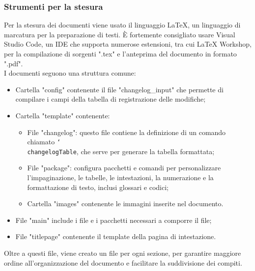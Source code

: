 \subsubsection{Strumenti per la stesura}
Per la stesura dei documenti viene usato il linguaggio LaTeX, un linguaggio di
marcatura per la preparazione di testi. È fortemente consigliato usare Visual
Studio Code, un IDE che supporta numerose estensioni, tra cui LaTeX Workshop,
per la compilazione di sorgenti ".tex" e l'anteprima del documento in formato
".pdf". \\I documenti seguono una struttura comune:
\begin{itemize}
      \item Cartella "config" contenente il file "changelog\_input" che permette di
            compilare i campi della tabella di registrazione delle modifiche;
      \item Cartella "template" contenente:
            \begin{itemize}
                  \item File "changelog": questo file contiene la definizione di un comando chiamato
                        \texttt{\char`\\changelogTable}, che serve per generare la tabella formattata;
                  \item File "package": configura pacchetti e comandi per personalizzare
                        l'impaginazione, le tabelle, le intestazioni, la numerazione e la formattazione
                        di testo, inclusi glossari e codici;
                  \item Cartella "images" contenente le immagini inserite nel documento.
            \end{itemize}
      \item File "main" include i file e i pacchetti necessari a comporre il file;
      \item File "titlepage" contenente il template della pagina di intestazione.
\end{itemize}
Oltre a questi file, viene creato un file per ogni sezione, per garantire maggiore ordine all'organizzazione
del documento e facilitare la suddivisione dei compiti.
